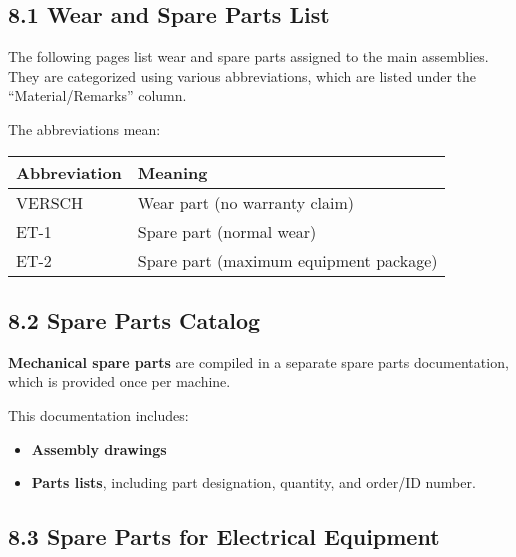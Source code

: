 

\setcounter{section}{0}

\subsection*{8.1 Wear and Spare Parts List}

The following pages list wear and spare parts assigned to the main assemblies.  
They are categorized using various abbreviations, which are listed under the  
\enquote{Material/Remarks} column.

The abbreviations mean:

\begin{table}[H]
    \centering
    \renewcommand{\arraystretch}{1.2}
    \begin{tabular}{|p{}|p{}|}
        \hline
        \textbf{Abbreviation} & \textbf{Meaning} \\
        \hline
        VERSCH & Wear part (no warranty claim) \\
        \hline
        ET-1 & Spare part (normal wear) \\
        \hline
        ET-2 & Spare part (maximum equipment package) \\
        \hline
    \end{tabular}
\end{table}

\subsection*{8.2 Spare Parts Catalog}

\textbf{Mechanical spare parts} are compiled in a separate spare parts  
documentation, which is provided once per machine.

This documentation includes:

\begin{itemize}
    \item \textbf{Assembly drawings}
    \item \textbf{Parts lists}, including part designation, quantity, and order/ID number.
\end{itemize}

\subsection*{8.3 Spare Parts for Electrical Equipment}

